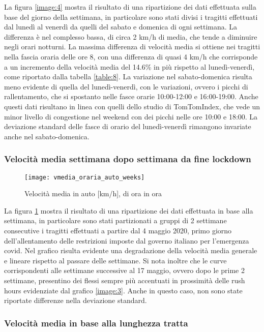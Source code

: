 La figura \ref{image:4} mostra il risultato di una ripartizione dei dati effettuata sulla base del giorno della settimana, in particolare sono stati divisi i tragitti effettuati dal lunedì al venerdì da quelli del sabato e domenica di ogni settimana. La differenza è nel complesso bassa, di circa 2 km/h di media, che tende a diminuire negli orari notturni. La massima differenza di velocità media si ottiene nei tragitti nella fascia oraria delle ore 8, con una differenza di quasi 4 km/h che corrisponde a un incremento della velocità media del 14.6\% in più rispetto al lunedì-venerdì, come riportato dalla tabella \ref{table:8}. La variazione nel sabato-domenica risulta meno evidente di quella del lunedì-venerdì, con le variazioni, ovvero i picchi di rallentamento, che si spostanto nelle fasce orarie 10:00-12:00 e 16:00-19:00. Anche questi dati risultano in linea con quelli dello studio di TomTomIndex\cite{tomtomindexmilan}, che vede un minor livello di congestione nel weekend con dei picchi nelle ore 10:00 e 18:00. La deviazione standard delle fasce di orario del lunedì-venerdì rimangono invariate anche nel sabato-domenica.

\subsubsection{Velocità media settimana dopo settimana da fine lockdown}

\begin{figure}[H]
\texttt{[image: vmedia\_oraria\_auto\_weeks]}
\caption{Velocità media in auto [km/h], di ora in ora}
\label{image:5}
\end{figure}

La figura \ref{image:5} mostra il risultato di una ripartizione dei dati effettuata in base alla settimana, in particolare sono stati partizionati a gruppi di 2 settimane consecutive i tragitti effettuati a partire dal 4 maggio 2020, primo giorno dell'allentamento delle restrizioni imposte dal governo italiano per l'emergenza covid\cite{dpcm26aprile}. Nel grafico risulta evidente una degradazione della velocità media generale e lineare rispetto al passare delle settimane. Si nota inoltre che le curve corrispondenti alle settimane successive al 17 maggio, ovvero dopo le prime 2 settimane, presentino dei flessi sempre più accentuati in prossimità delle rush hours evidenziate dal grafico \ref{image:3}. Anche in questo caso, non sono state riportate differenze nella deviazione standard.

\subsubsection{Velocità media in base alla lunghezza tratta}

